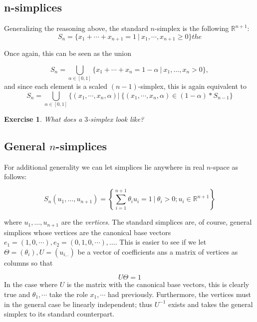 \documentclass{tufte-handout}
\newtheorem{exercise}{Exercise}
\newcommand{\re}{\mathbb{R}}
\begin{document}
\subsection{n-simplices}
Generalizing the reasoning above, the standard $n$-simplex is the following $\re^{n+1}$:
\begin{equation}
    S_n = \{x_1 + \cdots + x_{n+1} = 1\ |\  x_1, \cdots, x_{n+1} \geq 0 \}the 
    \label{standard-simplex}
\end{equation}

Once again, this can be seen as the union

\begin{equation}
  S_n =  \bigcup_{\alpha \in [0,1]} \{x_1+\cdots+x_n = 1-\alpha\ |\ x_1,\ldots,x_n>0\},
\end{equation}
and since each element is a scaled $(n-1)$-simplex, this is again equivalent to 
\begin{equation}
    S_n = \bigcup_{\alpha\in[0,1]} \{(x_1,\cdots,x_n,\alpha) | \ \{(x_1,\cdots,x_n,\alpha)\in (1-\alpha)*S_{n-1}  \}
\end{equation}
\begin{exercise}
What does a $3$-simplex look like?
\end{exercise}
\subsection{General $n$-simplices}
For additional generality we can let simplices lie anywhere in real $n$-space as follows:

\begin{equation}
    S_{n}(u_1,\ldots,u_{n+1}) = \left\{\sum_{i=1}^{n+1} \theta_i u_i = 1\ |\  \theta_i>0; u_i\in \re^{n+1} \right\}
    \label{geometric-simplex}
\end{equation}


where $u_1,\ldots,u_{n+1}$ are the \emph{vertices}. The standard simplices are, of course, general simplices whose vertices are the canonical base vectors $e_1=(1,0,\cdots),e_2=(0,1,0,\cdots),\ldots$. This is easier to see if we let $\Theta=(\theta_i), U = (u_{i,.})$  be a vector of coefficients ans a matrix of vertices as columns so that

\begin{equation}
    U\Theta= 1
\end{equation}
In the case where $U$ is the matrix with the canonical base vectors, this is clearly true and $\theta_1,\cdots$ take the role $x_1, \cdots$ had previously.
Furthermore, the vertices must in the general case be linearly independent; thus $U^{-1}$ exists and takes the general simplex to its standard counterpart.
\end{document}
